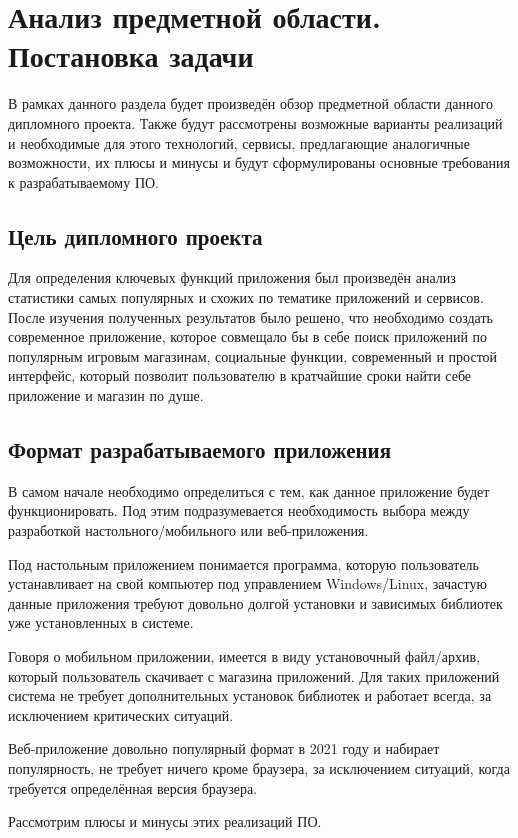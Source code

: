 \section{Анализ предметной области. Постановка задачи}
\label{sec:domain}
 
В рамках данного раздела будет произведён обзор предметной области данного дипломного проекта.
Также будут рассмотрены возможные варианты реализаций и необходимые для этого технологий, сервисы, предлагающие аналогичные возможности, их плюсы и минусы и будут сформулированы основные требования к разрабатываемому ПО.
 
\subsection{Цель дипломного проекта}
Для определения ключевых функций приложения был произведён анализ статистики самых популярных и схожих по тематике приложений и сервисов. После изучения полученных результатов было решено, что необходимо создать современное приложение, которое совмещало бы в себе поиск приложений по популярным игровым магазинам, социальные функции, современный и простой интерфейс, который позволит пользователю в кратчайшие сроки найти себе приложение и магазин по душе.

\subsection{Формат разрабатываемого приложения}
В самом начале необходимо определиться с тем, как данное приложение будет функционировать. Под этим подразумевается необходимость выбора между разработкой настольного/мобильного или веб-приложения.
 
Под настольным приложением понимается программа, которую пользователь устанавливает на свой компьютер под управлением Windows/Linux, зачастую данные приложения требуют довольно долгой установки и зависимых библиотек уже установленных в системе.

Говоря о мобильном приложении, имеется в виду установочный файл/архив, который пользователь скачивает с магазина приложений. Для таких приложений система не требует дополнительных установок библиотек и работает всегда, за исключением критических ситуаций.

Веб-приложение довольно популярный формат в 2021 году и набирает популярность, не требует ничего кроме браузера, за исключением ситуаций, когда требуется определённая версия браузера.

Рассмотрим плюсы и минусы этих реализаций ПО.

